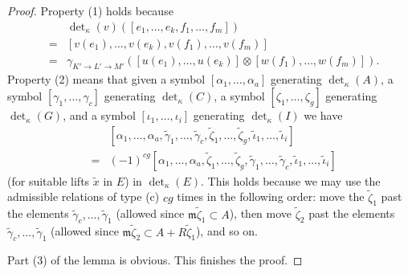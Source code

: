 \documentclass[10pt,a4paper]{amsart}
\theoremstyle{plain}
\theoremstyle{definition}
\theoremstyle{remark}
\numberwithin{equation}{subsection}
\begin{document}
\begin{proof}
\medskip\noindent
Property (1) holds because
\begin{eqnarray*}
& & \det\nolimits_\kappa(v)([e_1, \ldots, e_k, f_1, \ldots, f_m]) \\
& = &
[v(e_1), \ldots, v(e_k), v(f_1), \ldots, v(f_m)] \\
& = &
\gamma_{K' \to L' \to M'}([u(e_1), \ldots, u(e_k)]
\otimes [w(f_1), \ldots, w(f_m)]).
\end{eqnarray*}
Property (2) means that given a symbol
$[\alpha_1, \ldots, \alpha_a]$ generating $\det_\kappa(A)$,
a symbol $[\gamma_1, \ldots, \gamma_c]$ generating $\det_\kappa(C)$,
a symbol $[\zeta_1, \ldots, \zeta_g]$ generating $\det_\kappa(G)$, and
a symbol $[\iota_1, \ldots, \iota_i]$ generating $\det_\kappa(I)$
we have
\begin{eqnarray*}
& & [\alpha_1, \ldots, \alpha_a, \tilde\gamma_1, \ldots, \tilde\gamma_c,
\tilde\zeta_1, \ldots, \tilde\zeta_g, \tilde\iota_1, \ldots, \tilde\iota_i] \\
& = &
(-1)^{cg} [\alpha_1, \ldots, \alpha_a, \tilde\zeta_1, \ldots, \tilde\zeta_g,
\tilde\gamma_1, \ldots, \tilde\gamma_c, \tilde\iota_1, \ldots, \tilde\iota_i]
\end{eqnarray*}
(for suitable lifts $\tilde{x}$ in $E$) in $\det_\kappa(E)$.
This holds because we may use the admissible relations of type (c)
$cg$ times in the following order: move the
$\tilde\zeta_1$ past the elements
$\tilde\gamma_c, \ldots, \tilde\gamma_1$
(allowed since $\mathfrak m\tilde\zeta_1 \subset A$),
then move $\tilde\zeta_2$ past the elements
$\tilde\gamma_c, \ldots, \tilde\gamma_1$
(allowed since $\mathfrak m\tilde\zeta_2 \subset A + R\tilde\zeta_1$),
and so on.

\medskip\noindent
Part (3) of the lemma is obvious.
This finishes the proof.
\end{proof}
\end{document}
